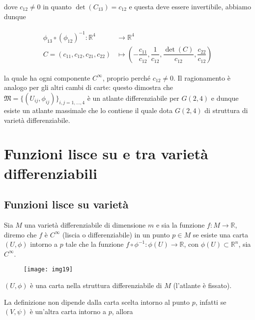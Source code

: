 dove $ c_{12} \neq 0 $ in quanto $ \det(C_{13}) = c_{12} $ e questa deve essere invertibile, abbiamo dunque

\begin{align}
	\begin{split}
		\phi_{13} \circ (\phi_{12})^{-1} : \mathbb{R}^{4} &\to \mathbb{R}^{4}\\
		C = (c_{11}, c_{12}, c_{21}, c_{22}) &\mapsto \left( - \dfrac{c_{11}}{c_{12}}, \dfrac{1}{c_{12}}, \dfrac{\det(C)}{c_{12}}, \dfrac{c_{22}}{c_{12}} \right)
	\end{split}
\end{align}

la quale ha ogni componente $ C^{\infty} $, proprio perché $ c_{12} \neq 0 $. Il ragionamento è analogo per gli altri cambi di carte: questo dimostra che $ \mathfrak{M} = \{(U_{ij},\phi_{ij})\}_{i,j=1,\dots,4} $ è un atlante differenziabile per $ G(2,4) $ e dunque esiste un atlante massimale che lo contiene il quale dota $ G(2,4) $ di struttura di varietà differenziabile.

\section{Funzioni lisce su e tra varietà differenziabili}

\subsection{Funzioni lisce su varietà}

Sia $ M $ una varietà differenziabile di dimensione $ m $ e sia la funzione $ f : M \to \mathbb{R} $, diremo che $ f $ è $ C^{\infty} $ (liscia o differenziabile) in un punto $ p \in M $ se esiste una carta $ (U,\phi) $ intorno a $ p $ tale che la funzione $ f \circ \phi^{-1} : \phi(U) \to \mathbb{R} $, con $ \phi(U) \subset \mathbb{R}^{n} $, sia $ C^{\infty} $.

\begin{figure}[H]
	\centering
	\texttt{[image: img19]}
\end{figure}

\begin{remark}
	$ (U,\phi) $ è una carta nella struttura differenziabile di $ M $ (l'atlante è fissato).
\end{remark}

La definizione non dipende dalla carta scelta intorno al punto $ p $, infatti se $ (V,\psi) $ è un'altra carta intorno a $ p $, allora

